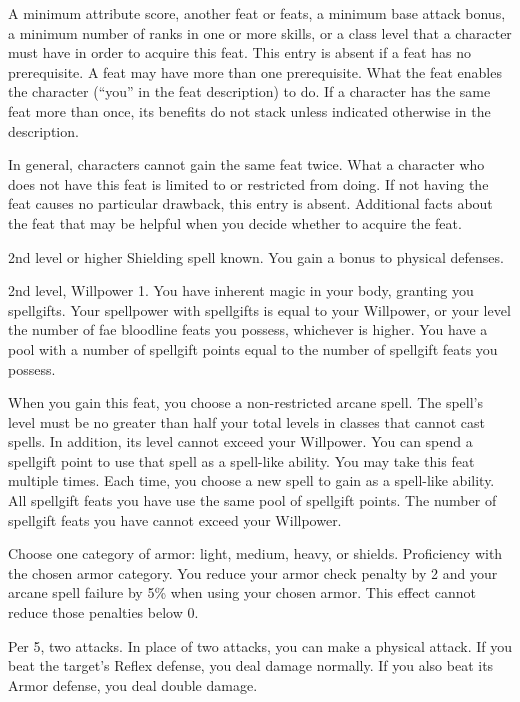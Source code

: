 \featpre A minimum attribute score, another feat or feats, a minimum base attack bonus, a minimum number of ranks in one or more skills, or a class level that a character must have in order to acquire this feat.
This entry is absent if a feat has no prerequisite.
A feat may have more than one prerequisite.
\featben What the feat enables the character (``you'' in the feat description) to do.
If a character has the same feat more than once, its benefits do not stack unless indicated otherwise in the description.
\par In general, characters cannot gain the same feat twice.
What a character who does not have this feat is limited to or restricted from doing.
If not having the feat causes no particular drawback, this entry is absent.
Additional facts about the feat that may be helpful when you decide whether to acquire the feat.

\featpre 2nd level or higher Shielding spell known.
\featben You gain a  bonus to physical defenses.

\featpres 2nd level, Willpower 1.
\featben You have inherent magic in your body, granting you spellgifts.
Your spellpower with spellgifts is equal to your Willpower, or your level \add the number of fae bloodline feats you possess, whichever is higher.
You have a pool with a number of spellgift points equal to the number of spellgift feats you possess.

When you gain this feat, you choose a non-restricted arcane spell.
The spell's level must be no greater than half your total levels in classes that cannot cast spells.
In addition, its level cannot exceed your Willpower.
You can spend a spellgift point to use that spell as a spell-like ability.
You may take this feat multiple times.
Each time, you choose a new spell to gain as a spell-like ability.
All spellgift feats you have use the same pool of spellgift points.
The number of spellgift feats you have cannot exceed your Willpower.

Choose one category of armor: light, medium, heavy, or shields.
\featpre Proficiency with the chosen armor category.
\featben You reduce your armor check penalty by 2 and your arcane spell failure by 5\% when using your chosen armor.
This effect cannot reduce those penalties below 0.

\featpre Per 5, two attacks.
\featben In place of two attacks, you can make a physical attack.
If you beat the target's Reflex defense, you deal damage normally.
If you also beat its Armor defense, you deal double damage.

